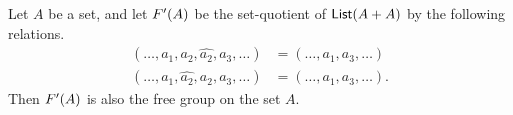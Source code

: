 \documentclass[hott-all.tex]{subfiles}
\begin{document}
% 
% 
% 
\begin{thm}
  Let $A$ be a set, and let $F'(A)$ be the set-quotient of $\mathsf{List}(A+A)$ by the following relations.
  \begin{align*}
    (\dots,a_1,a_2,\widehat{a_2},a_3,\dots) &=
    (\dots,a_1,a_3,\dots)\\
    (\dots,a_1,\widehat{a_2},a_2,a_3,\dots) &=
    (\dots,a_1,a_3,\dots).
  \end{align*}
  Then $F'(A)$ is also the free group on the set $A$.
\end{thm}
% 
\end{document}
